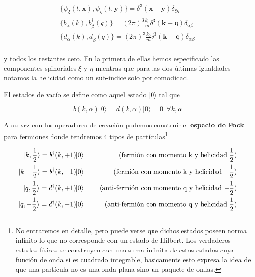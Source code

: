 \documentclass[tickz]{article}
\numberwithin{equation}{section}
\begin{document}
\begin{equation}\label{key}
\begin{aligned}
\{\psi_{\xi}(t,\mathbf{x}),\psi_{\eta}^{\dagger}(t,\mathbf{y})\} = \delta^3(\mathbf{x}-\mathbf{y})\delta_{\xi \eta}\\
\{b_{\alpha}(k),b_{\beta}^{\dagger}(q)\} = (2\pi)^3\frac{k_0}{m}\delta^3(\mathbf{k}-\mathbf{q})\delta_{\alpha \beta}\\
\{d_{\alpha}(k),d_{\beta}^{\dagger}(q)\} = (2\pi)^3\frac{k_0}{m}\delta^3(\mathbf{k}-\mathbf{q})\delta_{\alpha \beta}\\
\end{aligned}
\end{equation}

y todos los restantes cero. En la primera de ellas hemos especificado las componentes spinoriales $ \xi $ y $ \eta $ mientras que para las dos últimas igualdades notamos la helicidad como un sub-indice solo por comodidad.

El estados de vacío se define como aquel estado $ |0\rangle $ tal que 

\begin{equation}\label{key}
b(k,\alpha)|0\rangle = d(k,\alpha)|0\rangle=0 \ \ \forall k,\alpha
\end{equation}

A su vez con los operadores de creación podemos construir el \textbf{espacio de Fock} para fermiones donde tendremos 4 tipos de partículas\footnote{ No entraremos en detalle, pero puede verse que dichos estados poseen norma infinito lo que no corresponde con un estado de Hilbert. Los verdaderos estados físicos se construyen con una suma infinita de estos estados cuya función de onda si es cuadrado integrable, basicamente esto expresa la idea de que una partícula no es una onda plana sino un paquete de ondas.}

\begin{equation}\label{key}
\left.\begin{aligned}
|k,\frac{1}{2}\rangle = b^{\dagger}(k,+1)|0\rangle\\
|k,-\frac{1}{2}\rangle = b^{\dagger}(k,-1)|0\rangle\\
|q,\frac{1}{2}\rangle = d^{\dagger}(k,+1)|0\rangle\\
|q,-\frac{1}{2}\rangle = d^{\dagger}(k,-1)|0\rangle
\end{aligned}
\right.\begin{aligned}
\qquad \text{(fermión con momento k y helicidad $ \frac{1}{2} $)}\\
\qquad \text{(fermión con momento k y helicidad $ -\frac{1}{2} $)}\\
\qquad \text{(anti-fermión con momento q y helicidad $ -\frac{1}{2} $)}\\
\qquad \text{(anti-fermión con momento q y helicidad $ \frac{1}{2} $)}
\end{aligned}
\end{equation}  
\end{document}
